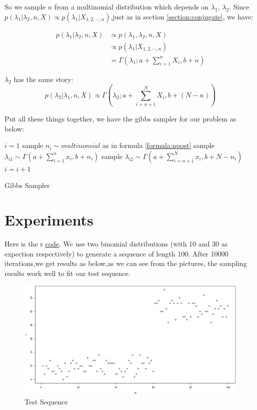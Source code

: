 \documentclass[12pt]{article}
\begin{document}
So we sample $n$ from a multinomial distribution which depends on $\lambda_1$, $\lambda_2$. Since $p(\lambda_1|\lambda_2,n,X) \propto p(\lambda_1|X_{1,2,\cdots,n})$,just as in section \ref{section:conjugate}, we have:

\begin{equation}
\begin{split}
p(\lambda_1|\lambda_2,n,X) & \propto p(\lambda_1,\lambda_2,n,X) \\  
						   & \propto p(\lambda_1|X_{1,2,\cdots,n}) \\
						   & = \Gamma(\lambda_1;a + \sum_{i=1}^nX_i,b + n)
\end{split}
\end{equation}

$\lambda_2$ has the same story:
\begin{equation}
p(\lambda_2|\lambda_1,n,X) \propto \Gamma(\lambda_2; a + \sum_{i=n+1}^NX_i,b+(N-n))
\end{equation}

Put all these things together, we have the gibbs sampler for our problem as below:

\begin{algorithm}[H]
$i = 1$\;
 {
	sample $n_i \sim multinomial$ as in formula \ref{formula:npost}\;
	sample $\lambda_{i1} \sim \Gamma(a+\sum_{i=1}^nx_i,b+n_i)$\;
	sample $\lambda_{i2} \sim \Gamma(a+\sum_{i=n+1}^Nx_i,b+N-n_i)$\;
	$i = i + 1$\;
}
\caption{Gibbs Sampler}
\end{algorithm}

\section{Experiments}
Here is the r \href{https://github.com/lleia/miscelaneous/blob/master/r/change_point_model/changePointModel.r}{code}. We use two binomial distributions (with 10 and 30 as expection respectively) to generate a sequence of length 100. After 10000 iterations,we get results as below,as we can see from the pictures, the sampling results work well to fit our test sequence.
 
\begin{figure}
\caption{Test Sequence}
\centering
	\includegraphics[width=5in]{seq.eps}
\end{figure}
\end{document}
